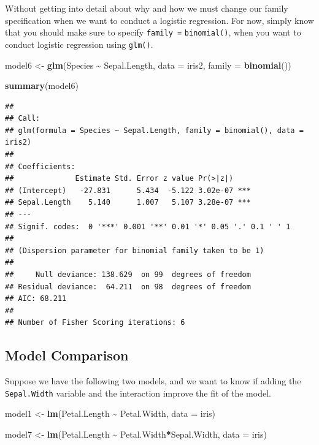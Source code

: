 \documentclass[
]{book}
\newenvironment{Shaded}{\begin{snugshade}}{\end{snugshade}}
\newcommand{\AttributeTok}[1]{\textcolor[rgb]{0.13,0.29,0.53}{#1}}
\newcommand{\FunctionTok}[1]{\textcolor[rgb]{0.13,0.29,0.53}{\textbf{#1}}}
\newcommand{\NormalTok}[1]{#1}
\newcommand{\OtherTok}[1]{\textcolor[rgb]{0.56,0.35,0.01}{#1}}
\newcommand{\SpecialCharTok}[1]{\textcolor[rgb]{0.81,0.36,0.00}{\textbf{#1}}}
\begin{document}
Without getting into detail about why and how we must change our family specification when we want to conduct a logistic regression. For now, simply know that you should make sure to specify \texttt{family\ =} \texttt{binomial()}, when you want to conduct logistic regression using \texttt{glm()}.

\begin{Shaded}
\begin{Highlighting}[]
\NormalTok{model6 }\OtherTok{\textless{}{-}} \FunctionTok{glm}\NormalTok{(Species }\SpecialCharTok{\textasciitilde{}}\NormalTok{ Sepal.Length, }\AttributeTok{data =}\NormalTok{ iris2, }\AttributeTok{family =} \FunctionTok{binomial}\NormalTok{())}

\FunctionTok{summary}\NormalTok{(model6)}
\end{Highlighting}
\end{Shaded}

\begin{verbatim}
## 
## Call:
## glm(formula = Species ~ Sepal.Length, family = binomial(), data = iris2)
## 
## Coefficients:
##              Estimate Std. Error z value Pr(>|z|)    
## (Intercept)   -27.831      5.434  -5.122 3.02e-07 ***
## Sepal.Length    5.140      1.007   5.107 3.28e-07 ***
## ---
## Signif. codes:  0 '***' 0.001 '**' 0.01 '*' 0.05 '.' 0.1 ' ' 1
## 
## (Dispersion parameter for binomial family taken to be 1)
## 
##     Null deviance: 138.629  on 99  degrees of freedom
## Residual deviance:  64.211  on 98  degrees of freedom
## AIC: 68.211
## 
## Number of Fisher Scoring iterations: 6
\end{verbatim}

\subsection{Model Comparison}\label{model-comparison}

Suppose we have the following two models, and we want to know if adding the \texttt{Sepal.Width} variable and the interaction improve the fit of the model.

\begin{Shaded}
\begin{Highlighting}[]
\NormalTok{model1 }\OtherTok{\textless{}{-}} \FunctionTok{lm}\NormalTok{(Petal.Length }\SpecialCharTok{\textasciitilde{}}\NormalTok{ Petal.Width, }\AttributeTok{data =}\NormalTok{ iris)}

\NormalTok{model7 }\OtherTok{\textless{}{-}} \FunctionTok{lm}\NormalTok{(Petal.Length }\SpecialCharTok{\textasciitilde{}}\NormalTok{ Petal.Width}\SpecialCharTok{*}\NormalTok{Sepal.Width, }\AttributeTok{data =}\NormalTok{ iris)}
\end{Highlighting}
\end{Shaded}
\end{document}
